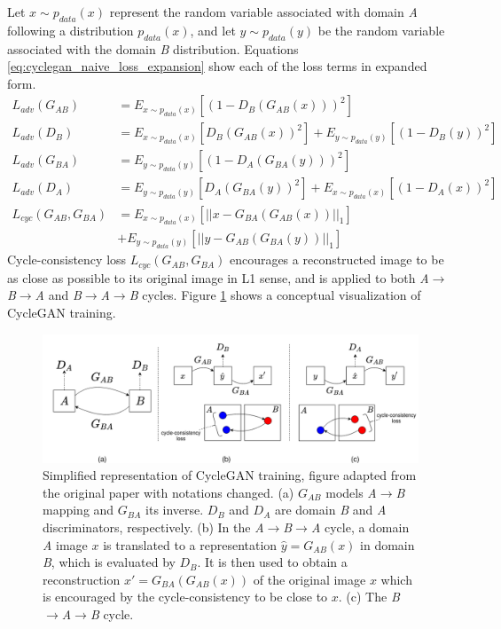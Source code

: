 Let $x \sim p_{data}(x)$ represent the random variable associated with domain \textit{A} following a distribution $p_{data}(x)$, and let $y \sim p_{data}(y)$ be the random variable associated with the domain \textit{B} distribution. Equations \ref{eq:cyclegan_naive_loss_expansion} show each of the loss terms in expanded form.
\begin{equation}
    \begin{aligned}
    L_{adv}(G_{AB}) &= E_{x \sim p_{data}(x)} [(1 - D_B(G_{AB}(x)))^2]  \\[1mm]
    L_{adv}(D_B) &= E_{x \sim p_{data}(x)} [D_B(G_{AB}(x))^2] + E_{y \sim p_{data}(y)} [(1 - D_B(y))^2] \\[4mm]
    L_{adv}(G_{BA}) &= E_{y \sim p_{data}(y)} [(1 - D_A(G_{BA}(y)))^2]  \\[1mm]
    L_{adv}(D_A) &= E_{y \sim p_{data}(y)} [D_A(G_{BA}(y))^2] + E_{x \sim p_{data}(x)} [(1 - D_A(x))^2] \\[4mm]
    L_{cyc}(G_{AB}, G_{BA}) &= E_{x \sim p_{data}(x)} [|| x - G_{BA}(G_{AB}(x)) ||_1]  \\
                            &+ E_{y \sim p_{data}(y)} [|| y - G_{AB}(G_{BA}(y)) ||_1] 
    \end{aligned}
    \label{eq:cyclegan_naive_loss_expansion}
\end{equation}
Cycle-consistency loss $L_{cyc}(G_{AB}, G_{BA})$ encourages a reconstructed image to be as close as possible to its original image in L1 sense, and is applied to both \textit{A}$\rightarrow$\textit{B}$\rightarrow$\textit{A} and \textit{B}$\rightarrow$\textit{A}$\rightarrow$\textit{B} cycles. Figure \ref{fig:cyclegan_concept} shows a conceptual visualization of CycleGAN training.

\begin{figure}
    \centering
    \includegraphics[width=\textwidth]{figures/GANs/cyclegan_concept.png}
    \caption{Simplified representation of CycleGAN training, figure adapted from the original paper \cite{zhu2017unpaired} with notations changed. (a) $G_{AB}$ models \textit{A}$\rightarrow$\textit{B} mapping and $G_{BA}$ its inverse. $D_B$ and $D_A$ are domain \textit{B} and \textit{A} discriminators, respectively. (b) In the \textit{A}$\rightarrow$\textit{B}$\rightarrow$\textit{A} cycle, a domain \textit{A} image $x$ is translated to a representation \textit{$\hat{y} = G_{AB}(x)$} in domain \textit{B}, which is evaluated by $D_B$. It is then used to obtain a reconstruction $x' = G_{BA}(G_{AB}(x))$ of the original image $x$ which is encouraged by the cycle-consistency to be close to $x$. (c) The \textit{B}$\rightarrow$\textit{A}$\rightarrow$\textit{B} cycle.}
    \label{fig:cyclegan_concept}
\end{figure}


